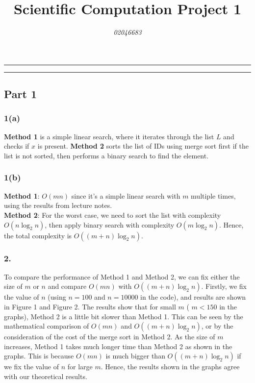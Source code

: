 \documentclass{article}
\title{Scientific Computation Project 1}
\author{\emph{02046683}}
\begin{document}
\maketitle

\hrule
\hrule

\subsection*{Part 1}

\subsubsection*{1(a)}
\textbf{Method 1} is a simple linear search, where it iterates through the list \( L \) and checks if \( x \) is present.  
\textbf{Method 2} sorts the list of IDs using merge sort first if the list is not sorted, then performs a binary search to find the element.

\subsubsection*{1(b)}
\textbf{Method 1}: \( O(mn) \) since it’s a simple linear search with \( m \) multiple times, using the results from lecture notes. \\
\textbf{Method 2}: For the worst case, we need to sort the list with complexity \( O(n \log_2 n) \), then apply binary search with complexity \( O(m \log_2 n) \).
Hence, the total complexity is \( O((m + n) \log_2 n) \).


\subsubsection*{2.}
 To compare the performance of Method 1 and Method 2, we can fix either the size of \( m \) or \( n \) and compare \( O(mn) \) with \( O((m + n) \log_2 n) \).  
Firstly, we fix the value of \( n \) (using \( n = 100 \) and \( n = 10000 \) in the code), and results are shown in Figure 1 and Figure 2.  
The results show that for small \( m \) ( \( m < 150 \) in the graphs), Method 2 is a little bit slower than Method 1. This can be seen by the mathematical comparison of \( O(mn) \) and \( O((m + n) \log_2 n) \), or by the consideration of the cost of the merge sort in Method 2.  
As the size of \( m \) increases, Method 1 takes much longer time than Method 2 as shown in the graphs. This is because \( O(mn) \) is much bigger than \( O((m + n) \log_2 n) \) if we fix the value of \( n \) for large \( m \). Hence, the results shown in the graphs agree with our theoretical results.
\end{document}
